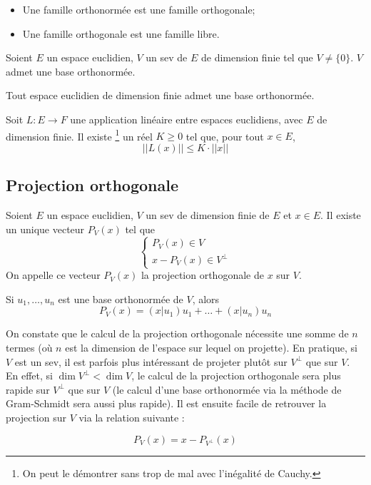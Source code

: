 \begin{myprop}\InsertTheoremBreak
	\begin{itemize}
		\item Une famille orthonormée est une famille orthogonale;
		\item Une famille orthogonale est une famille libre.
	\end{itemize}
\end{myprop}

\begin{myprop}
	Soient $E$ un espace euclidien, $V$ un sev de $E$ de dimension finie tel que $V \neq \{0\}$. $V$ admet une base orthonormée.
\end{myprop}

\begin{mycorr}
	Tout espace euclidien de dimension finie admet une base orthonormée.
\end{mycorr}

\begin{myprop}
	Soit $L : E \to F$ une application linéaire entre espaces euclidiens, avec $E$ de dimension finie.
	Il existe
	\footnote{On peut le démontrer sans trop de mal avec l'inégalité de Cauchy.}
	un réel $K \geq 0$ tel que, pour tout $x \in E$,
	\[ ||L(x)|| \leq K \cdot ||x|| \]
\end{myprop}

\subsection{Projection orthogonale}
\begin{mytheo}
	Soient $E$ un espace euclidien, $V$ un sev de dimension finie de $E$ et $x \in E$.
	Il existe un unique vecteur $P_V(x)$ tel que
	\[
	\left\{
	\begin{array}{l}
		P_V(x) \in V\\
		x - P_V(x) \in V^{\perp}
	\end{array}
	\right.
	\]
	On appelle ce vecteur $P_V(x)$ la projection orthogonale de $x$ sur $V$.

	Si $u_1, \ldots, u_n$ est une base orthonormée de $V$, alors
	\[ P_V(x) = (x|u_1)u_1 + \ldots + (x|u_n)u_n \]
\end{mytheo}

\begin{myrem}
On constate que le calcul de la projection orthogonale nécessite une somme de $n$ termes 
(où $n$ est la dimension de l'espace sur lequel on projette). En pratique, si $V$ est un
sev, il est parfois plus intéressant de projeter plutôt sur $V^{\perp}$ que sur $V$. En 
effet, si $\dim V^{\perp} < \dim V$, le calcul de la projection orthogonale sera plus rapide
sur $V^{\perp}$ que sur $V$ (le calcul d'une base orthonormée via la méthode de Gram-Schmidt
sera aussi plus rapide). Il est ensuite facile de retrouver la projection sur $V$ via 
la relation suivante :

\[ P_V(x) = x - P_{V^{\perp}}(x) \]
\end{myrem}

